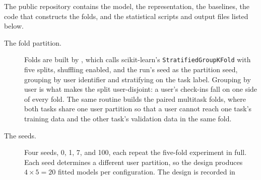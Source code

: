 The public repository contains the model, the representation, the baselines, the code
that constructs the folds, and the statistical scripts and output files listed below.

\begin{description}
  \item[The fold partition.] Folds are built by
        , which calls scikit-learn's
        \texttt{StratifiedGroupKFold} with five splits, shuffling enabled, and the run's
        seed as the partition seed, grouping by user identifier and stratifying on the task
        label. Grouping by user is what makes the split user-disjoint: a user's
        check-ins fall on one side of every fold.
        The same routine builds the paired multitask folds, where both tasks share one
        user partition so that a user
        cannot reach one task's training data and the other task's validation data in
        the same fold.
  \item[The seeds.] Four seeds, 0, 1, 7, and 100, each repeat the
        five-fold experiment in full. Each seed determines a different user
        partition, so the design produces $4\times5=20$ fitted models per
        configuration. The design is recorded in

\end{description}
